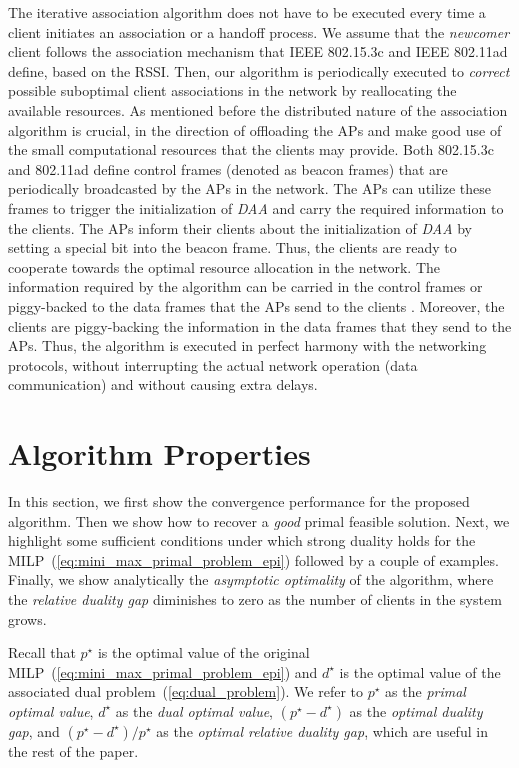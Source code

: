 \documentclass[journal, 10pt, twocolumn]{IEEEtran}
\begin{document}
The iterative association algorithm does not have to be executed every time a client initiates an association or a handoff process. We assume that the \emph{newcomer} client follows the association mechanism that IEEE 802.15.3c and IEEE 802.11ad define, based on the RSSI. Then, our algorithm is periodically executed to \emph{correct} possible suboptimal client associations in the network by reallocating the available resources. As mentioned before the distributed nature of the association algorithm is crucial, in the direction of offloading the APs and make good use of the small computational resources that the clients may provide. Both 802.15.3c and 802.11ad define control frames (denoted as beacon frames) that are periodically broadcasted by the APs in the network. The APs can utilize these frames to trigger the initialization of \emph{DAA} and carry the required information to the clients. The APs inform their clients about the initialization of \emph{DAA} by setting a special bit into the beacon frame. Thus, the clients are ready to cooperate towards the optimal resource allocation in the network. The information required by the algorithm can be carried in the control frames or piggy-backed to the data frames that the APs send to the clients \cite{Athanasiou08}. Moreover, the clients are piggy-backing the information in the data frames that they send to the APs. Thus, the algorithm is executed in perfect harmony with the networking protocols, without interrupting the actual network operation (data communication) and without causing extra delays. 


\section{Algorithm Properties}\label{sec:algorithm_prop}
In this section, we first show the convergence performance for the proposed algorithm. Then we show how to recover a \emph{good} primal feasible solution. Next, we highlight some sufficient conditions under which strong duality holds for the MILP~(\ref{eq:mini_max_primal_problem_epi}) followed by a couple of examples. Finally, we show analytically the \emph{asymptotic optimality} of the algorithm, where the \emph{relative duality gap} diminishes to zero as the number of clients in the system grows.

Recall that $p^\star$ is the optimal value of the original MILP~(\ref{eq:mini_max_primal_problem_epi}) and $d^\star$ is the optimal value of the associated dual problem~(\ref{eq:dual_problem}). We refer to $p^\star$ as the \emph{primal optimal value}, $d^\star$ as the \emph{dual optimal value}, $(p^\star-d^\star)$ as the \emph{optimal duality gap}, and $(p^\star-d^\star)/p^\star$  as the \emph{optimal relative duality gap}, which are useful in the rest of the paper. 
\end{document}
